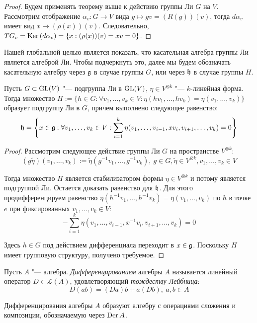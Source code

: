 \begin{proof}
	Будем применять теорему выше к действию группы Ли $G$ на $V$. Рассмотрим отображение $\alpha_v: G \to V$ вида $g \mapsto gv = (R(g))(v)$, тогда $d\alpha_v$ имеет вид $x \mapsto (\rho(x))(v)$. Следовательно, $TG_v = \operatorname{Ker}{(d\alpha_v)} = \{x : (\rho(x))(v) = xv = 0\}$.
\end{proof}

\begin{note}
	Нашей глобальной целью является показать, что касательная алгебра группы Ли является алгеброй Ли. Чтобы подчеркнуть это, далее мы будем обозначать касательную алгебру через $\mathfrak g$ в случае группы $G$, или через $\mathfrak h$ в случае группы $H$.
\end{note}

\begin{theorem}
	Пусть $G \subset \operatorname{GL}(V)$ "--- подгруппа Ли в $\operatorname{GL}(V)$, $\eta \in V^{\otimes k}$ "--- $k$-линейная форма. Тогда множество $H := \{h \in G: \forall v_1, \dotsc, v_k \in V: \eta(hv_1, \dotsc, hv_k) = \eta(v_1, \dotsc, v_k)\}$ образует подгруппу Ли в $G$, причем выполнено следующее равенство:
	\[\mathfrak h = \left\{x \in \mathfrak g: \forall v_1, \dotsc, v_k \in V: \sum_{i = 1}^k\eta(v_1, \dotsc, v_{i - 1}, x v_i, v_{i+1}, \dotsc, v_k) = 0\right\}\]
\end{theorem}

\begin{proof}
	Рассмотрим следующее действие группы Ли $G$ на пространстве $V^{\otimes k}$:
	\[(g\widetilde\eta)(v_1, \dotsc, v_k) := \widetilde\eta(g^{-1}v_1, \dotsc, g^{-1}v_k),~g \in G, \widetilde\eta \in V^{\otimes k}, v_1, \dotsc, v_k \in V\]
	
	Тогда множество $H$ является стабилизатором формы $\eta \in V^{\otimes k}$ и потому является подгруппой Ли. Остается доказать равенство для $\mathfrak h$. Для этого продифференцируем равенство $\eta(h^{-1}v_1, \dotsc, h^{-1}v_k) = \eta(v_1, \dotsc, v_k)$ по $h$ в точке $e$ при фиксированных $v_1, \dotsc, v_k \in V$:
	\[-\sum_{i = 1}^k\eta(v_1, \dotsc, v_{i - 1}, x^{-1} v_i, v_{i+1}, \dotsc, v_k) = 0\]
	
	Здесь $h \in G$ под действием дифференциала переходит в $x \in \mathfrak g$. Поскольку $H$ имеет групповую структуру, получено требуемое.
\end{proof}

\begin{definition}
	Пусть $A$ "--- алгебра. \textit{Дифференцированием} алгебры $A$ называется линейный оператор $D \in \mathcal{L}(A)$, удовлетворяющий \textit{тождеству Лейбница}:
	\[D(ab) = (Da)b + a(Db),~a, b \in A\]
	
	Дифференцирования алгебры $A$ образуют алгебру с операциями сложения и композиции, обозначаемую через $\operatorname{Der}{A}$.
\end{definition}

